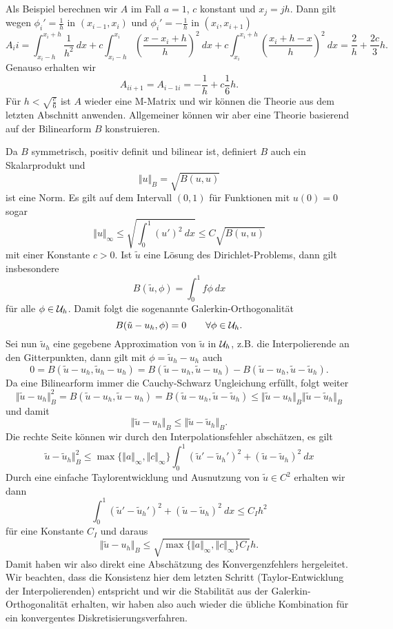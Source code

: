 \begin{example}{}{}
Als Beispiel berechnen wir $A$ im Fall $a=1$, $c$ konstant und $x_j = jh$. Dann gilt wegen $\phi_i'=\frac{1}h$ in $(x_{i-1},x_i)$ und $\phi_i'=-\frac{1}h$ in $(x_{i },x_{i+1})$
$$ A_ii = \int_{x_i-h}^{x_i+h} \frac{1}{h^2}~dx + c  \int_{x_i-h}^{x_i} \left( \frac{x-x_{i}+h}h \right)^2~dx
+ c  \int_{x_i}^{x_i+h} \left( \frac{x_{i}+h-x}h \right)^2~dx = \frac{2}h + \frac{2c}3 h. $$
Genauso erhalten wir 
$$ A_{ii+1}=A_{i-1i} = - \frac{1}h + c \frac{1}6 h.$$
F\"ur $h < \sqrt{\frac{c}6}$ ist $A$ wieder eine M-Matrix und wir k\"onnen die Theorie aus dem letzten Abschnitt anwenden. Allgemeiner k\"onnen wir aber eine Theorie basierend auf der Bilinearform $B$ konstruieren. 
\end{example}

Da $B$ symmetrisch, positiv definit und bilinear ist, definiert $B$ auch ein Skalarprodukt und 
$$ \Vert u \Vert_B = \sqrt{B(u,u)} $$
ist eine Norm. Es gilt auf dem Intervall $(0,1)$ f\"ur Funktionen mit $u(0) = 0$ sogar 
$$ \Vert u\Vert_\infty \leq \sqrt{\int_0^1 (u')^2~dx} \leq C \sqrt{B(u,u)} $$
mit einer Konstante $c > 0$. Ist $\tilde u$ eine L\"osung des Dirichlet-Problems, dann gilt insbesondere
$$ B(\tilde u,\phi) = \int_0^1 f \phi ~dx
$$ f\"ur alle $\phi \in {\cal U}_h$. Damit folgt die sogenannte Galerkin-Orthogonalit\"at
$$ B(\tilde u - u_h, \phi) = 0 \qquad \forall \phi \in {\cal U}_h. $$
Sei nun $\tilde u_h$ eine gegebene Approximation von $\tilde u$ in ${\cal U}_h$, z.B. die Interpolierende an den Gitterpunkten, 
dann gilt mit $\phi = \tilde u_h - u_h$ auch 
$$ 0 = B(\tilde u - u_h,\tilde u_h - u_h) = B(\tilde u - u_h, \tilde u - u_h)  - B(\tilde u - u_h,\tilde u - \tilde u_h). $$
Da eine Bilinearform immer die Cauchy-Schwarz Ungleichung erf\"ullt, folgt weiter
$$ \Vert \tilde u - u_h \Vert_B^2 =  B(\tilde u - u_h, \tilde u - u_h)=  B(\tilde u - u_h,\tilde u - \tilde u_h) 
\leq \Vert \tilde u - u_h \Vert_B \Vert \tilde u - \tilde u_h \Vert_B $$
und damit 
$$ \Vert \tilde u - u_h \Vert_B \leq \Vert \tilde u - \tilde u_h \Vert_B. $$ 
Die rechte Seite k\"onnen wir durch den Interpolationsfehler absch\"atzen, es gilt 
$$ \tilde u - \tilde u_h \Vert_B^2 \leq \max\{\Vert a\Vert_\infty, \Vert c \Vert_\infty\} \int_0^1 ( \tilde u' - \tilde u_h')^2 + 
 ( \tilde u - \tilde u_h)^2~dx $$
Durch eine einfache Taylorentwicklung und Ausnutzung von $\tilde u \in C^2$ erhalten wir dann 
$$  \int_0^1 ( \tilde u' - \tilde u_h')^2 + 
 ( \tilde u - \tilde u_h)^2~dx \leq C_I h^2 $$
f\"ur eine Konstante $C_I$ und daraus 
$$ \Vert \tilde u - u_h \Vert_B  \leq \sqrt{\max\{\Vert a\Vert_\infty, \Vert c \Vert_\infty\} C_I} h. $$
Damit haben wir also direkt eine Absch\"atzung des Konvergenzfehlers hergeleitet. Wir beachten, dass die Konsistenz hier dem letzten Schritt (Taylor-Entwicklung der Interpolierenden) entspricht und wir die Stabilit\"at aus der Galerkin-Orthogonalit\"at erhalten, wir haben also auch wieder die \"ubliche Kombination f\"ur ein konvergentes Diskretisierungsverfahren.